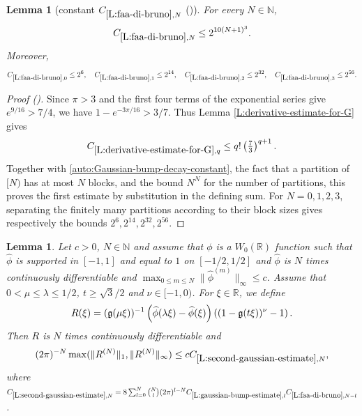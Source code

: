 \documentclass[12pt,reqno]{amsart}
\newcommand{\auto}{{({\tiny\faCar})}}
\theoremstyle{plain}
\newtheorem{lemma}[theorem]{Lemma}
\numberwithin{equation}{section}
\theoremstyle{remark}
\newcommand{\using}[1]{}
\newcommand{\R}{{\mathbb R}}
\newcommand{\N}{{\mathbb N}}
\begin{document}
\begin{lemma}[constant $C_{\ref{L:faa-di-bruno},N}$ \auto]\label{constant faa di bruno}\using{L:derivative-estimate-for-G}\using{Gaussian bump decay}
For every $N\in\N$,
\begin{equation}\label{constant faa di bruno bound}
C_{\ref{L:faa-di-bruno},N}\le2^{10(N+1)^3}.
\end{equation}
Moreover,
\begin{equation}\label{auto:constant-faa-di-bruno-small}
C_{\ref{L:faa-di-bruno},0}\le2^6,
\quad
C_{\ref{L:faa-di-bruno},1}\le2^{14},
\quad
C_{\ref{L:faa-di-bruno},2}\le2^{32},
\quad
C_{\ref{L:faa-di-bruno},3}\le2^{56}.
\end{equation}
\end{lemma}
\begin{proof}[Proof \auto]
Since $\pi>3$ and the first four terms of the exponential series give $e^{9/16}>7/4$, we have $1-e^{-3\pi/16}>3/7$. Thus Lemma \ref{L:derivative-estimate-for-G} gives
\[
C_{\ref{L:derivative-estimate-for-G},q}
\le q!\left(\tfrac73\right)^{q+1}.
\]
Together with \eqref{auto:Gaussian-bump-decay-constant}, the fact that a partition of $[N)$ has at most $N$ blocks, and the bound $N^N$ for the number of partitions, this proves the first estimate by substitution in the defining sum. For $N=0,1,2,3$, separating the finitely many partitions according to their block sizes gives respectively the bounds $2^6,2^{14},2^{32},2^{56}$.
\end{proof}


\begin{lemma}\label{L:second-gaussian-estimate}\using{L:gaussian-bump-estimate}\using{L:faa-di-bruno}
Let $c>0$, $N\in \mathbb N$ and assume that $\phi$ is a $W_0(\R)$ function such that
$\widehat{\phi}$ is supported in $[-1,1]$ and equal to $1$ on $[-1/2,1/2]$ and $\widehat{\phi}$ is $N$ times continuously differentiable and $\max_{0\leq m \leq N} \|\widehat{\phi}^{(m)}\|_{\infty} \leq c$.
Assume that $0<\mu \leq \lambda \leq 1/2$, $t\geq \sqrt{3}/2$ and $\nu \in [-1,0)$. For $\xi \in \R$, we define
\begin{equation}\label{auto:second-Gaussian-multiplier}
R(\xi)=(\mathfrak{g}(\mu\xi))^{-1}\left(\widehat{\phi}(\lambda\xi)-\widehat{\phi}(\xi)\right)\left((1-\mathfrak{g}(t\xi))^{\nu} -1\right).
\end{equation}
Then $R$ is $N$ times continuously differentiable and
\begin{equation}\label{E:estimate-R}
(2\pi)^{-N} \max(\|R^{(N)}\|_1,\|R^{(N)}\|_\infty) \leq cC_{\ref{L:second-gaussian-estimate},N},
\end{equation}
where $C_{\ref{L:second-gaussian-estimate},N}=8\sum_{l=0}^N \binom{N}{l} (2\pi)^{l-N} C_{\ref{L:gaussian-bump-estimate},l} C_{\ref{L:faa-di-bruno},N-l}$.

\end{lemma}
\end{document}
